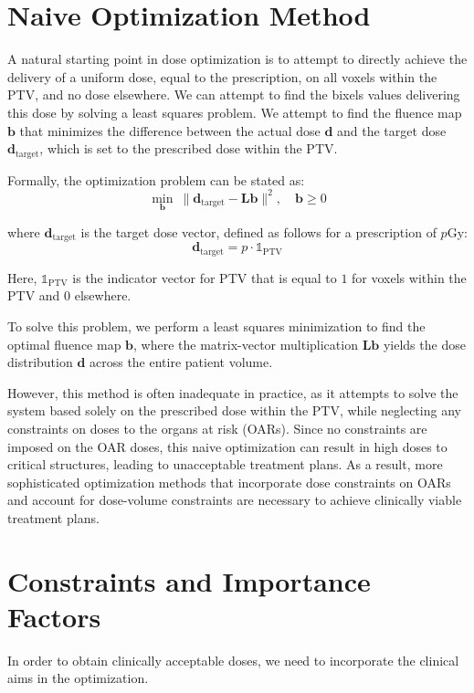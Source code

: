 \section{Naive Optimization Method}
\label{naive_optimization}
A natural starting point in dose optimization is to attempt to directly achieve the delivery of a uniform dose, equal to the prescription, on all voxels within the PTV, and no dose elsewhere.
We can attempt to find the bixels values delivering this dose by solving a least squares problem.
We attempt to find the fluence map $\mathbf{b}$ that minimizes the difference between the actual dose $\mathbf{d}$ and the target dose $\mathbf{d}_{\text{target}}$, which is set to the prescribed dose within the PTV.

Formally, the optimization problem can be stated as:
$$ \min_\mathbf{b} \ \| \mathbf{d}_{\text{target}} - \textbf{L}\mathbf{b} \|^2, \quad \mathbf{b} \geq 0$$

where $\mathbf{d}_{\text{target}}$ is the target dose vector, defined as follows for a prescription of $p$Gy:
$$ \mathbf{d}_{\text{target}} = p \cdot  \mathds{1}_{\text{PTV}} $$

Here, $\mathds{1}_{\text{PTV}}$ is the indicator vector for PTV that is equal to $1$ for voxels within the PTV and $0$ elsewhere.

To solve this problem, we perform a least squares minimization to find the optimal fluence map $\mathbf{b}$, where the matrix-vector multiplication $\textbf{L}\mathbf{b}$ yields the dose distribution $\mathbf{d}$ across the entire patient volume.

However, this method is often inadequate in practice, as it attempts to solve the system based solely on the prescribed dose within the PTV, while neglecting any constraints on doses to the organs at risk (OARs).
Since no constraints are imposed on the OAR doses, this naive optimization can result in high doses to critical structures, leading to unacceptable treatment plans.
As a result, more sophisticated optimization methods that incorporate dose constraints on OARs and account for dose-volume constraints are necessary to achieve clinically viable treatment plans.

\section{Constraints and Importance Factors}
In order to obtain clinically acceptable doses, we need to incorporate the clinical aims in the optimization.

